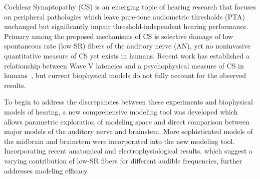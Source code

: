 Cochlear Synaptopathy (CS) is an emerging topic of hearing research that focuses on peripheral pathologies which leave pure-tone audiometric thresholds (PTA) unchanged but significantly impair threshold-independent hearing performance. Primary among the proposed mechanisms of CS is selective damage of low spontaneous rate (low SR) fibers of the auditory nerve (AN), yet no noninvasive quantitative measure of CS yet exists in humans. Recent work has established a relationship between Wave V latencies and a psychophysical measure of CS in humans~\citep{Mehraei2016Auditory}, but current biophysical models do not fully account for the observed results.

To begin to address the discrepancies between these experiments and biophysical models of hearing, a new comprehensive modeling tool was developed which allows parametric exploration of modeling space and direct comparison between major models of the auditory nerve and brainstem. More sophisticated models of the midbrain and brainstem were incorporated into the new modeling tool. Incorporating recent anatomical and electrophysiological results, which suggest a varying contribution of low-SR fibers for different audible frequencies, further addresses modeling efficacy.
